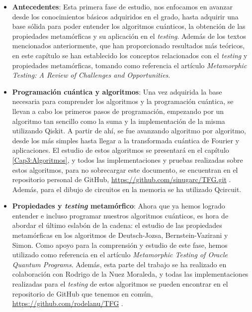 \begin{itemize}
    \item \textbf{Antecedentes}: Esta primera fase de estudio, nos enfocamos en avanzar desde los conocimientos básicos adquiridos en el grado, hasta adquirir una base sólida para poder entender los algoritmos cuánticos, la obtención de las propiedades metamórficas y su aplicación en el \textit{testing}. Además de los textos mencionados anteriormente, que han proporcionado resultados más teóricos, en este capítulo se han establecido los conceptos relacionados con el \textit{testing} y propiedades metamórficas, tomando como referencia el artículo \textit{Metamorphic Testing: A Review of Challenges and Opportunities}\cite{AR:MTmain:2008}.
    
    \item \textbf{Programación cuántica y algoritmos}: Una vez adquirida la base necesaria para comprender los algoritmos y la programación cuántica, se llevan a cabo los primeros pasos de programación, empezando por un algoritmo tan sencillo como la suma y la implementación de la misma utilizando Qiskit. A partir de ahí, se fue avanzando algoritmo por algoritmo, desde los más simples hasta llegar a la transformada cuántica de Fourier y aplicaciones. El estudio de estos algoritmos se presentará en el capítulo \ref{Cap3:Algoritmos}, y todos las implementaciones y pruebas realizadas sobre estos algoritmos, para no sobrecargar este documento, se encuentran en el repositorio personal de GitHub, \url{https://github.com/sinugarc/TFG.git} . Además, para el dibujo de circuitos en la memoria se ha utilizado Qcircuit\cite{AR:QcircT:2004}. 
    
    \item \textbf{Propiedades y \textit{testing} metamórfico}: Ahora que ya hemos logrado entender e incluso programar nuestros algoritmos cuánticos, es hora de abordar el último eslabón de la cadena: el estudio de las propiedades metamórficas en los algoritmos de Deutsch-Jozsa, Bernstein-Vazirani y Simon. Como apoyo para la comprensión y estudio de este fase, hemos utilizado como referencia en el artículo \textit{Metamorphic Testing of Oracle Quantum Programs}\cite{metamorphicAdd:2022}. Además, esta parte del trabajo se ha realizado en colaboración con Rodrigo de la Nuez Moraleda, y todas las implementaciones realizadas para el \textit{testing} de estos algoritmos se pueden encontrar en el repositorio de GitHub que tenemos en común, \url{https://github.com/rodelanu/TFG} .
\end{itemize}

